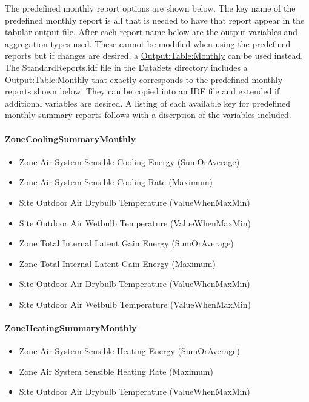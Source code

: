 The predefined monthly report options are shown below. The key name of the predefined monthly report is all that is needed to have that report appear in the tabular output file. After each report name below are the output variables and aggregation types used. These cannot be modified when using the predefined reports but if changes are desired, a \hyperref[outputtablemonthly]{Output:Table:Monthly} can be used instead. The StandardReports.idf file in the DataSets directory includes a \hyperref[outputtablemonthly]{Output:Table:Monthly} that exactly corresponds to the predefined monthly reports shown below. They can be copied into an IDF file and extended if additional variables are desired. A listing of each available key for predefined monthly summary reports follows with a discrption of the variables included.

\paragraph{ZoneCoolingSummaryMonthly}\label{zonecoolingsummarymonthly}

\begin{itemize}
\item
  Zone Air System Sensible Cooling Energy (SumOrAverage)
\item
  Zone Air System Sensible Cooling Rate (Maximum)
\item
  Site Outdoor Air Drybulb Temperature (ValueWhenMaxMin)
\item
  Site Outdoor Air Wetbulb Temperature (ValueWhenMaxMin)
\item
  Zone Total Internal Latent Gain Energy (SumOrAverage)
\item
  Zone Total Internal Latent Gain Energy (Maximum)
\item
  Site Outdoor Air Drybulb Temperature (ValueWhenMaxMin)
\item
  Site Outdoor Air Wetbulb Temperature (ValueWhenMaxMin)
\end{itemize}

\paragraph{ZoneHeatingSummaryMonthly}\label{zoneheatingsummarymonthly}

\begin{itemize}
\item
  Zone Air System Sensible Heating Energy (SumOrAverage)
\item
  Zone Air System Sensible Heating Rate (Maximum)
\item
  Site Outdoor Air Drybulb Temperature (ValueWhenMaxMin)
\end{itemize}

